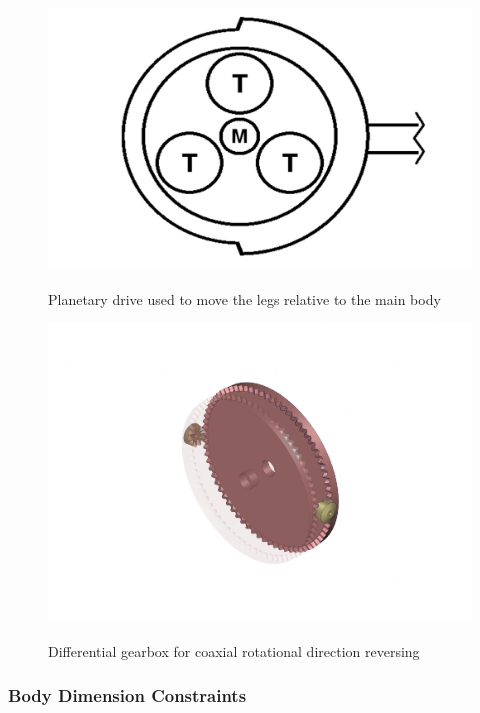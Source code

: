 \documentclass[11pt]{article}		%
\newlength{\imageheight}	 %
\begin{document}
				\begin{figure}[h]
					\centering
					\begin{multicols}{2}
						\includegraphics[height=\imageheight]{planetaryDrive}
						\caption{Planetary drive used to move the legs relative to the main body}
						\label{planetaryDrive}
						\columnbreak
						\includegraphics[height=\imageheight]{diffGearbox}
						\caption{Differential gearbox for coaxial rotational direction reversing}
						\label{diffGearbox}
					\end{multicols}
				\end{figure}
				
			\subsubsection{Body Dimension Constraints}
			
\end{document}
